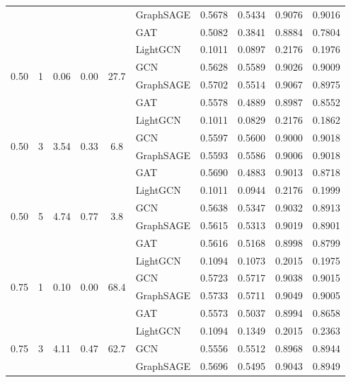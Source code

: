{\begin{longtable}{cccccl rrrr}
 & & & & & GraphSAGE & 0.5678 & 0.5434 & 0.9076 & 0.9016 \\
 & & & & & GAT & 0.5082 & 0.3841 & 0.8884 & 0.7804 \\
\midrule
\multirow{4}{*}{0.50} & \multirow{4}{*}{1} & \multirow{4}{*}{0.06} & \multirow{4}{*}{0.00} & \multirow{4}{*}{27.7} & LightGCN & 0.1011 & 0.0897 & 0.2176 & 0.1976 \\
 & & & & & GCN & 0.5628 & 0.5589 & 0.9026 & 0.9009 \\
 & & & & & GraphSAGE & 0.5702 & 0.5514 & 0.9067 & 0.8975 \\
 & & & & & GAT & 0.5578 & 0.4889 & 0.8987 & 0.8552 \\
\midrule
\multirow{4}{*}{0.50} & \multirow{4}{*}{3} & \multirow{4}{*}{3.54} & \multirow{4}{*}{0.33} & \multirow{4}{*}{6.8} & LightGCN & 0.1011 & 0.0829 & 0.2176 & 0.1862 \\
 & & & & & GCN & 0.5597 & 0.5600 & 0.9000 & 0.9018 \\
 & & & & & GraphSAGE & 0.5593 & 0.5586 & 0.9006 & 0.9018 \\
 & & & & & GAT & 0.5690 & 0.4883 & 0.9013 & 0.8718 \\
\midrule
\multirow{4}{*}{0.50} & \multirow{4}{*}{5} & \multirow{4}{*}{4.74} & \multirow{4}{*}{0.77} & \multirow{4}{*}{3.8} & LightGCN & 0.1011 & 0.0944 & 0.2176 & 0.1999 \\
 & & & & & GCN & 0.5638 & 0.5347 & 0.9032 & 0.8913 \\
 & & & & & GraphSAGE & 0.5615 & 0.5313 & 0.9019 & 0.8901 \\
 & & & & & GAT & 0.5616 & 0.5168 & 0.8998 & 0.8799 \\
\midrule
\multirow{4}{*}{0.75} & \multirow{4}{*}{1} & \multirow{4}{*}{0.10} & \multirow{4}{*}{0.00} & \multirow{4}{*}{68.4} & LightGCN & 0.1094 & 0.1073 & 0.2015 & 0.1975 \\
 & & & & & GCN & 0.5723 & 0.5717 & 0.9038 & 0.9015 \\
 & & & & & GraphSAGE & 0.5733 & 0.5711 & 0.9049 & 0.9005 \\
 & & & & & GAT & 0.5573 & 0.5037 & 0.8994 & 0.8658 \\
\midrule
\multirow{4}{*}{0.75} & \multirow{4}{*}{3} & \multirow{4}{*}{4.11} & \multirow{4}{*}{0.47} & \multirow{4}{*}{62.7} & LightGCN & 0.1094 & 0.1349 & 0.2015 & 0.2363 \\
 & & & & & GCN & 0.5556 & 0.5512 & 0.8968 & 0.8944 \\
 & & & & & GraphSAGE & 0.5696 & 0.5495 & 0.9043 & 0.8949 \\

\end{longtable}}
